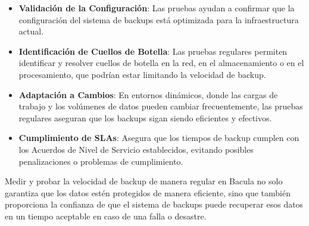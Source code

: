 \begin{itemize}
    \item \textbf{Validación de la Configuración}: Las pruebas ayudan a confirmar que la configuración del sistema de backups está optimizada para la infraestructura actual.
    \item \textbf{Identificación de Cuellos de Botella}: Las pruebas regulares permiten identificar y resolver cuellos de botella en la red, en el almacenamiento o en el procesamiento, que podrían estar limitando la velocidad de backup.
    \item \textbf{Adaptación a Cambios}: En entornos dinámicos, donde las cargas de trabajo y los volúmenes de datos pueden cambiar frecuentemente, las pruebas regulares aseguran que los backups sigan siendo eficientes y efectivos.
    \item \textbf{Cumplimiento de SLAs}: Asegura que los tiempos de backup cumplen con los Acuerdos de Nivel de Servicio establecidos, evitando posibles penalizaciones o problemas de cumplimiento.
\end{itemize}

Medir y probar la velocidad de backup de manera regular en Bacula no solo garantiza que los datos estén protegidos de manera eficiente, sino que también proporciona la confianza de que el sistema de backups puede recuperar esos datos en un tiempo aceptable en caso de una falla o desastre.

